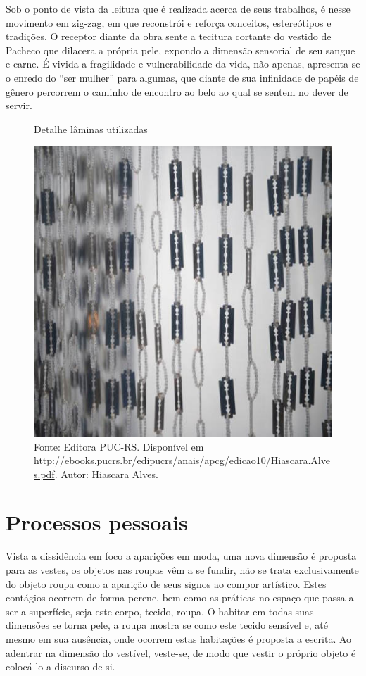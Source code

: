 \begin{refsection}
    Sob o ponto de vista da leitura que é realizada acerca de seus trabalhos, é nesse movimento em zig-zag, em que reconstrói e reforça conceitos, estereótipos e tradições. O receptor diante da obra sente a tecitura cortante do vestido de Pacheco que dilacera a própria pele, expondo a dimensão sensorial de seu sangue e carne. É vivida a fragilidade e vulnerabilidade da vida, não apenas, apresenta-se o enredo do ``ser mulher'' para algumas, que diante de sua infinidade de papéis de gênero percorrem o caminho de encontro ao belo ao qual se sentem no dever de servir.

    \begin{figure}[ht]%
        \centering%
        \caption{Detalhe lâminas utilizadas}%
        \includegraphics[width=.75\textwidth]{articles/13-dispositivo-moda-a-r/image2.jpg}%
        \caption*{Fonte: Editora PUC-RS. Disponível em \url{http://ebooks.pucrs.br/edipucrs/anais/apcg/edicao10/Hiascara.Alves.pdf}. Autor: Hiascara Alves.}%
        \label{fig:detalhe-vestido-acrilico}%
    \end{figure}%

    \section{Processos pessoais}

    Vista a dissidência em foco a aparições em moda, uma nova dimensão é proposta para as vestes, os objetos nas roupas vêm a se fundir, não se trata exclusivamente do objeto roupa como a aparição de seus signos ao compor artístico. Estes contágios ocorrem de forma perene, bem como as práticas no espaço que passa a ser a superfície, seja este corpo, tecido, roupa. O habitar em todas suas dimensões se torna pele, a roupa mostra se como este tecido sensível e, até mesmo em sua ausência, onde ocorrem estas habitações é proposta a escrita. Ao adentrar na dimensão do vestível, veste-se, de modo que vestir o próprio objeto é colocá-lo a discurso de si. 


\end{refsection}
